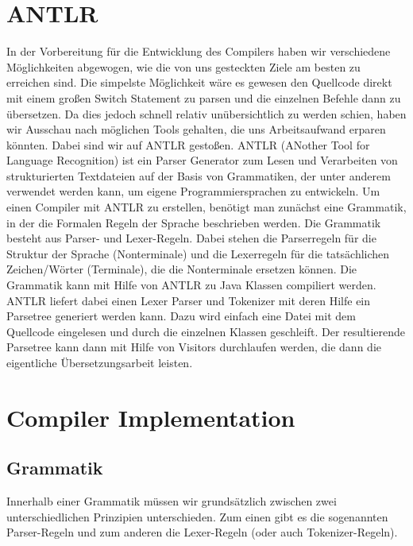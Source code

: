 \documentclass[paper=a4,fontsize=12pt]{scrreprt}
\begin{document}
\section{ANTLR}
In der Vorbereitung für die Entwicklung des Compilers haben wir verschiedene Möglichkeiten abgewogen, wie die von uns gesteckten Ziele am besten zu erreichen sind. Die simpelste Möglichkeit wäre es gewesen den Quellcode direkt mit einem großen Switch Statement zu parsen und die einzelnen Befehle dann zu übersetzen. Da dies jedoch schnell relativ unübersichtlich zu werden schien, haben wir Ausschau nach möglichen Tools gehalten, die uns Arbeitsaufwand erparen könnten. Dabei sind wir auf ANTLR gestoßen.
ANTLR (ANother Tool for Language Recognition) ist ein Parser Generator zum Lesen und Verarbeiten von strukturierten Textdateien auf der Basis von Grammatiken, der unter anderem verwendet werden kann, um eigene Programmiersprachen zu entwickeln.
Um einen Compiler mit ANTLR zu erstellen, benötigt man zunächst eine Grammatik, in der die Formalen Regeln der Sprache beschrieben werden. Die Grammatik besteht aus Parser- und Lexer-Regeln. Dabei stehen die Parserregeln für die Struktur der Sprache (Nonterminale) und die Lexerregeln für die tatsächlichen Zeichen/Wörter (Terminale), die die Nonterminale ersetzen können.
Die Grammatik kann mit Hilfe von ANTLR zu Java Klassen compiliert werden. ANTLR liefert dabei einen Lexer Parser und Tokenizer mit deren Hilfe ein Parsetree generiert werden kann. Dazu wird einfach eine Datei mit dem Quellcode eingelesen und durch die einzelnen Klassen geschleift. Der resultierende Parsetree kann dann mit Hilfe von Visitors durchlaufen werden, die dann die eigentliche Übersetzungsarbeit leisten.

\section{Compiler Implementation}

\subsection{Grammatik}
Innerhalb einer Grammatik müssen wir grundsätzlich zwischen zwei unterschiedlichen Prinzipien unterschieden. Zum einen gibt es die sogenannten Parser-Regeln und zum anderen die Lexer-Regeln (oder auch Tokenizer-Regeln).
\end{document}
